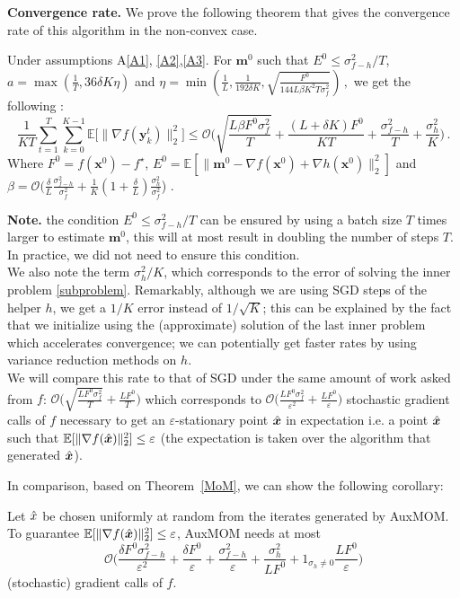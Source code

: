 \documentclass[10pt]{article} %
\theoremstyle{plain}
\theoremstyle{definition}
\theoremstyle{remark}
\newcommand{\norm}[1]{\|#1\|_2}
\def\vm{{\bm{m}}}
\def\vx{{\bm{x}}}
\def\vy{{\bm{y}}}
\newcommand{\E}{\mathbb{E}}
\begin{document}
\textbf{Convergence rate.}
We prove the following theorem that gives the convergence rate of this algorithm in the non-convex case.\\
\begin{framedtheorem}\label{MoM}
Under assumptions A\ref{A1}, \ref{A2},\ref{A3}. For $\vm^0$ such that $E^0\leq \sigma_{f-h}^2/T$, $a = \max(\frac{1}{T},36\delta K\eta)$ and 
$\eta = \min(\frac{1}{L},\frac{1}{192\delta K}, \sqrt{\frac{F^0}{144L\beta K^2T\sigma_f^2}})\, ,$
we get the following :
$$\frac{1}{KT}\sum_{t=1}^T\sum_{k=0}^{K-1} \E\big[\norm{\nabla f(\vy^t_k)}^2\big] \leq \mathcal{O}\Big( \sqrt{\frac{L\beta F^0\sigma_f^2}{T}} + \frac{(L +  \delta K)F^0}{KT} + \frac{\sigma_{f-h}^2}{T} + \frac{\sigma_h^2}{K}\Big)\, .$$
Where $F^0 = f(\vx^0) - f^\star$, $E^0 = \E[\norm{\vm^0 - \nabla f(\vx^0)+\nabla h(\vx^0)}^2]$ and $\beta = \mathcal{O}\big(\frac{\delta}{L}\frac{\sigma_{f-h}^2}{\sigma_{f}^2} + \frac{1}{K}(1+\frac{\delta}{L})\frac{\sigma_h^2}{\sigma_{f}^2}$\big)
.
\end{framedtheorem}
\textbf{Note.} the condition $E^0\leq \sigma_{f-h}^2/T$ can be ensured by using a batch size $T$ times larger to estimate $\vm^0$, this will at most result in doubling the number of steps $T$. In practice, we did not need to ensure this condition. \\
We also note the term $\sigma_h^2/K$, which corresponds to the error of solving the inner problem \ref{subproblem}. Remarkably, although we are using SGD steps of the helper $h$, we get a $1/K$ error instead of $1/\sqrt{K}$; this can be explained by the fact that we initialize using the (approximate) solution of the last inner problem which accelerates convergence; we can potentially get faster rates by using variance reduction methods on $h$.\\
We will compare this rate to that of SGD under the same amount of work asked from $f$:  $\mathcal{O}\bigg( \sqrt{\frac{LF^0\sigma_f^2}{T}} + \frac{L F^0}{T} \bigg)$ which corresponds to $\mathcal{O}\Big(\frac{LF^0\sigma_f^2}{\varepsilon^2} + \frac{LF^0}{\varepsilon}\Big)$ stochastic gradient calls of $f$ necessary to get an $\varepsilon$-stationary point $\Hat{\vx}$ in expectation i.e. a point $\Hat{\vx}$ such that $\E[\|\nabla f(\Hat{\vx})\|_2^2]\leq \varepsilon$ (the expectation is taken over the algorithm that generated $\Hat{\vx}$).

In comparison, based on Theorem~\ref{MoM}, we can show the following corollary:

\begin{framedcorollary}
Let $\Hat{x}$ be chosen uniformly at random from the iterates generated by AuxMOM.  To guarantee $\E[\|\nabla f(\Hat{\vx})\|_2^2]\leq \varepsilon$, AuxMOM needs at most $$\mathcal{O}\Big(\frac{\delta F^0\sigma_{f-h}^2}{\varepsilon^2} + \frac{\delta F^0}{\varepsilon} + \frac{\sigma_{f-h}^2}{\varepsilon} + \frac{\sigma_h^2}{LF^0} + 1_{\sigma_h\neq 0}\frac{LF^0}{\varepsilon} \Big)$$
(stochastic) gradient calls of $f$.   
\end{framedcorollary}
\end{document}
